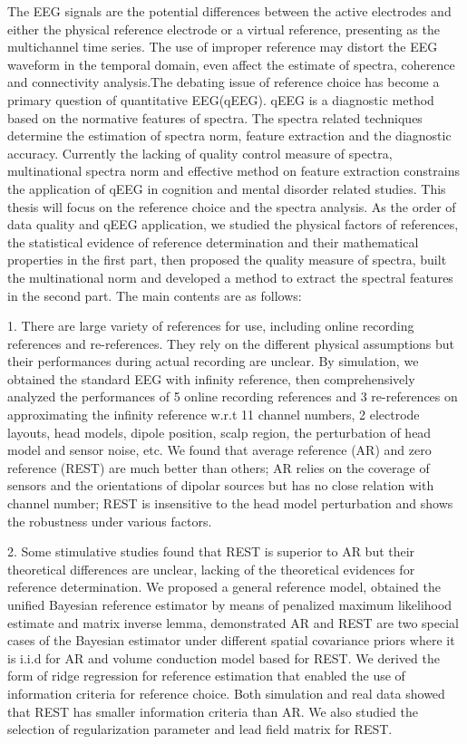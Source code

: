 
\begin{englishabstract}
The EEG signals are the potential differences between the active electrodes and either the physical reference electrode or a virtual reference, presenting as the multichannel time series. The use of improper reference may distort the EEG waveform in the temporal domain, even affect the estimate of spectra, coherence and connectivity analysis.The debating issue of reference choice has become a primary question of quantitative EEG(qEEG). qEEG is a diagnostic method based on the normative features of spectra. The spectra related techniques determine the estimation of spectra norm, feature extraction and the diagnostic accuracy. Currently the lacking of quality control measure of spectra, multinational spectra norm and effective method on feature extraction constrains the application of qEEG in cognition and mental disorder related studies. This thesis will focus on the reference choice and the spectra analysis. As the order of data quality and qEEG application, we studied the physical factors of references, the statistical evidence of reference determination and their mathematical properties in the first part, then proposed the quality measure of spectra, built the multinational norm and developed a method to extract the spectral features in the second part. The main contents are as follows:

1. There are large variety of references for use, including online recording references and re-references. They rely on the different physical assumptions but their performances during actual recording are unclear. By simulation, we obtained the standard EEG with infinity reference, then comprehensively analyzed the performances of 5 online recording references and 3 re-references on approximating the infinity reference w.r.t 11 channel numbers, 2 electrode layouts, head models, dipole position, scalp region, the perturbation of head model and sensor noise, etc. We found that average reference (AR) and zero reference (REST) are much better than others; AR relies on the coverage of sensors and the orientations of dipolar sources but has no close relation with channel number; REST is insensitive to the head model perturbation and shows the robustness under various factors. 

2. Some stimulative studies found that REST is superior to AR but their theoretical differences are unclear, lacking of the theoretical evidences for reference determination. We proposed a general reference model, obtained the unified Bayesian reference estimator by means of penalized maximum likelihood estimate and matrix inverse lemma, demonstrated AR and REST are two special cases of the Bayesian estimator under different spatial covariance priors where it is i.i.d for AR and volume conduction model based for REST. We derived the form of ridge regression for reference estimation that enabled the use of information criteria for reference choice. Both simulation and real data showed that REST has smaller information criteria than AR. We also studied the selection of regularization parameter and lead field matrix for REST. 


\end{englishabstract}
